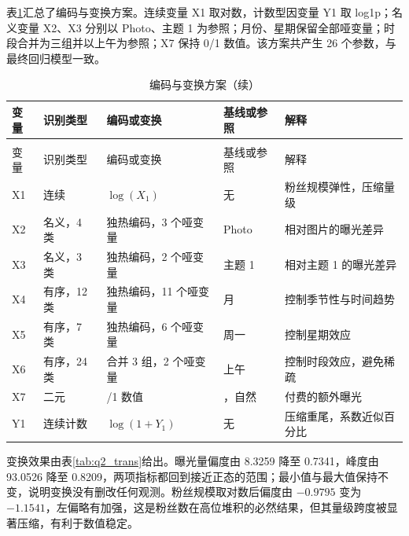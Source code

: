 表\ref{tab:q2_scheme}汇总了编码与变换方案。连续变量 X1 取对数，计数型因变量 Y1 取 log1p；名义变量 X2、X3 分别以 Photo、主题 1 为参照；月份、星期保留全部哑变量；时段合并为三组并以上午为参照；X7 保持 0/1 数值。该方案共产生 26 个参数，与最终回归模型一致。

\begin{longtable}{>{\centering\arraybackslash}p{}>{\centering\arraybackslash}p{}>{\centering\arraybackslash}p{}>{\centering\arraybackslash}p{}>{\centering\arraybackslash}p{}}
  \caption{编码与变换方案}
  \label{tab:q2_scheme} \\
  \toprule
  变量 & 识别类型 & 编码或变换 & 基线或参照 & 解释 \\
  \midrule
  \endfirsthead
  \caption{编码与变换方案（续）} \\
  \toprule
  变量 & 识别类型 & 编码或变换 & 基线或参照 & 解释 \\
  \midrule
  \endhead
  \bottomrule
  \endfoot
  X1 & 连续 & $\log(X_1)$ & 无 & 粉丝规模弹性，压缩量级 \\
  X2 & 名义，4 类 & 独热编码，3 个哑变量 & Photo & 相对图片的曝光差异 \\
  X3 & 名义，3 类 & 独热编码，2 个哑变量 & 主题 1 & 相对主题 1 的曝光差异 \\
  X4 & 有序，12 类 & 独热编码，11 个哑变量 & 1 月 & 控制季节性与时间趋势 \\
  X5 & 有序，7 类 & 独热编码，6 个哑变量 & 周一 & 控制星期效应 \\
  X6 & 有序，24 类 & 合并 3 组，2 个哑变量 & 上午 & 控制时段效应，避免稀疏 \\
  X7 & 二元 & 0/1 数值 & 0，自然 & 付费的额外曝光 \\
  Y1 & 连续计数 & $\log(1+Y_1)$ & 无 & 压缩重尾，系数近似百分比 \\
\end{longtable}

变换效果由表\ref{tab:q2_trans}给出。曝光量偏度由 8.3259 降至 0.7341，峰度由 93.0526 降至 0.8209，两项指标都回到接近正态的范围；最小值与最大值保持不变，说明变换没有删改任何观测。粉丝规模取对数后偏度由 $-0.9795$ 变为 $-1.1541$，左偏略有加强，这是粉丝数在高位堆积的必然结果，但其量级跨度被显著压缩，有利于数值稳定。

